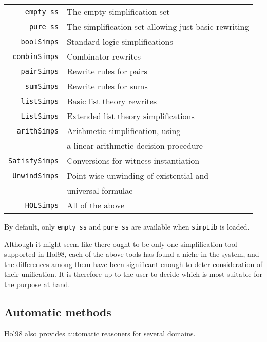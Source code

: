 \documentclass[12pt,fleqn,a4paper]{report}
\begin{document}
\begin{description}
\begin{center}
\begin{tabular}{|r|l|} \hline
  \verb+empty_ss+ & The empty simplification set \\
  \verb+pure_ss+ & The simplification set allowing just basic rewriting\\
  \verb+boolSimps+ & Standard logic simplifications \\
  \verb+combinSimps+ & Combinator rewrites \\
  \verb+pairSimps+ & Rewrite rules for pairs \\
  \verb+sumSimps+ & Rewrite rules for sums \\
  \verb+listSimps+ & Basic list theory rewrites \\
  \verb+ListSimps+ & Extended list theory simplifications \\
  \verb+arithSimps+ & Arithmetic simplification, using\\
                    & a linear arithmetic decision procedure \\
  \verb+SatisfySimps+ & Conversions for witness instantiation \\
  \verb+UnwindSimps+ & Point-wise unwinding of existential and\\
                     & universal formulae\\
  \verb+HOLSimps+ &  All of the above \\
  \hline
\end{tabular}
\end{center}

By default, only \verb+empty_ss+ and \verb+pure_ss+ are available when
\verb+simpLib+ is loaded.
\end{description}

\noindent Although it might seem like there ought to be only one simplification
tool supported in Hol98, each of the above tools has found a niche in
the system, and the differences among them have been significant
enough to deter consideration of their unification. It is therefore up
to the user to decide which is most suitable for the purpose at hand.


\subsection{Automatic methods}

Hol98 also provides automatic reasoners for several domains.
\end{document}

